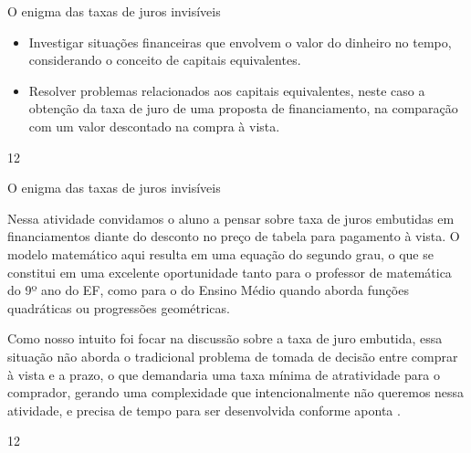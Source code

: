 \begin{objectives}{O enigma das taxas de juros invisíveis}
{
\begin{itemize}
\item Investigar situações financeiras que envolvem o valor do dinheiro no tempo, considerando o conceito de capitais equivalentes. 
\item Resolver problemas relacionados aos capitais equivalentes, neste caso a obtenção da taxa de juro de uma proposta de financiamento, na comparação com um valor descontado na compra à vista.
\end{itemize}
}{1}{2}
\end{objectives}
\marginpar{\vspace{-2em}}
\begin{sugestions}{O enigma das taxas de juros invisíveis}
{
Nessa atividade convidamos o aluno a pensar sobre taxa de juros embutidas em financiamentos diante do desconto no preço de tabela para pagamento à vista. O modelo matemático aqui resulta em uma equação do segundo grau, o que se constitui em uma excelente oportunidade tanto para o professor de matemática do 9º ano do EF, como para o do Ensino Médio quando aborda funções quadráticas ou progressões geométricas. 

Como nosso intuito foi focar na discussão sobre a taxa de juro embutida, essa situação não aborda o tradicional problema de tomada de decisão entre comprar à vista e a prazo, o que demandaria uma taxa mínima de atratividade para o comprador, gerando uma complexidade que intencionalmente não queremos nessa atividade, e precisa de tempo para ser desenvolvida conforme aponta \cite{muniz2016a}.

}{1}{2}
\end{sugestions}
